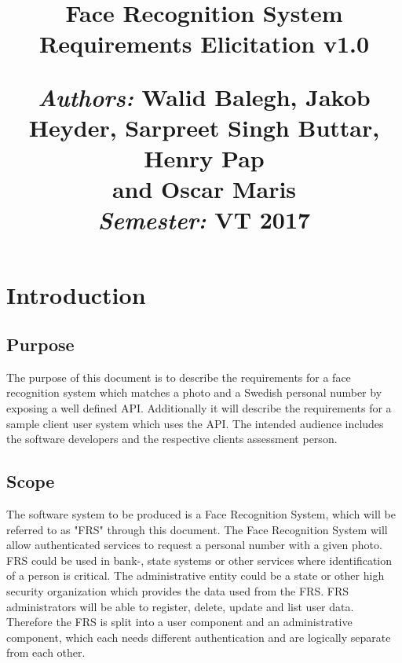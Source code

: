 \documentclass[a4paper,11pt]{article}
\title{
\vspace{-8cm}
\begin{flushleft}
    \vspace{10cm}
    \normalfont \normalsize
    \vspace{-1.3cm}
\end{flushleft}
\vspace{3cm}
\begin{flushleft}
    \huge Face Recognition System \\
    \LARGE  Requirements Elicitation v1.0\\
\end{flushleft}
\null
\vfill
\begin{minipage}{\textwidth}
\begin{flushleft} \large
\emph{Authors:} Walid Balegh, Jakob Heyder, Sarpreet Singh Buttar, Henry Pap\\ \hspace{45pt} and Oscar Maris \\ %
\emph{Semester:} VT 2017\\ %
\end{flushleft}
\end{minipage}
}
\date{}
\begin{document}
\maketitle

\newpage

\tableofcontents

\newpage





\newpage

\section{Introduction}

\subsection{Purpose}
The purpose of this document is to describe the requirements for a face recognition system which matches a photo and a Swedish personal number by exposing a well defined API. Additionally it will describe the requirements for a sample client user system which uses the API.
\newline
\noindent
The intended audience includes the software developers and the respective clients assessment person.

\subsection{Scope}

The software system to be produced is a Face Recognition System, which will be referred  to as "FRS" through this document.
\newline
\noindent
The Face Recognition System will allow authenticated services to request a personal number with a given photo.
FRS could be used in bank-, state systems or other services where identification of a person is critical.
The administrative entity could be a state or other high security organization which provides the data used from the FRS. \label{HighSecurityOrganisation}
FRS administrators will be able to register, delete, update and list user data.
Therefore the FRS is split into a user component and an administrative component, which each needs different authentication and are logically separate from each other.
\end{document}
